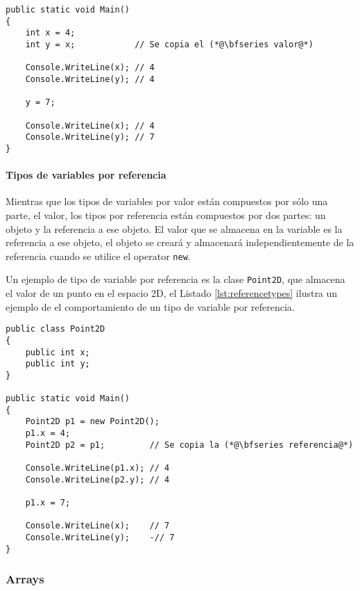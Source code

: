 \documentclass{pre-tfg}
\begin{document}
\begin{spacing}{1}
\begin{lstlisting}[float=htbp, caption=Ejemplo de tipo de variable por valor, label=lst:valuedtypes]
public static void Main()
{
	int x = 4;	
	int y = x;            // Se copia el (*@\bfseries valor@*)
	
	Console.WriteLine(x); // 4
	Console.WriteLine(y); // 4
	
	y = 7;
		
	Console.WriteLine(x); // 4
	Console.WriteLine(y); // 7
}
\end{lstlisting}
\end{spacing}

\paragraph{Tipos de variables por referencia}

Mientras que los tipos de variables por valor están compuestos por sólo una parte, el valor, los tipos por referencia están compuestos por dos partes: un objeto y la referencia a ese objeto. El valor que se almacena en la variable es la referencia a ese objeto, el objeto se creará y almacenará independientemente de la referencia cuando se utilice el operator \texttt{new}.

Un ejemplo de tipo de variable por referencia es la clase \texttt{Point2D}, que almacena el valor de un punto en el espacio 2D, el Listado \ref{lst:referencetypes} ilustra un ejemplo de el comportamiento de un tipo de variable por referencia.

\begin{spacing}{1}
\begin{lstlisting}[float=htbp, caption=Ejemplo de tipo de variable por referencia, label=lst:referencetypes]
public class Point2D 
{ 
	public int x;
	public int y;
}

public static void Main()
{
	Point2D p1 = new Point2D();
	p1.x = 4;
	Point2D p2 = p1;         // Se copia la (*@\bfseries referencia@*)
	
	Console.WriteLine(p1.x); // 4
	Console.WriteLine(p2.y); // 4
	
	p1.x = 7;
		
	Console.WriteLine(x);    // 7
	Console.WriteLine(y);    -// 7
}
\end{lstlisting}
\end{spacing}

\subsubsection{Arrays}
\end{document}
